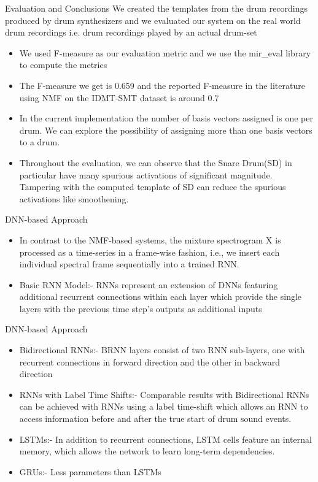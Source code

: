 \begin{frame}[t,fragile]{Evaluation and Conclusions}
We created the templates from the drum recordings produced by drum synthesizers and we evaluated our system on the real world drum recordings i.e. drum recordings played by an actual drum-set
\begin{itemize}
\item We used F-measure as our evaluation metric and we use the mir\_eval library to compute the metrics
\item The F-measure we get is 0.659 and the reported F-measure in the literature using NMF on the IDMT-SMT dataset is around $0.7$
\item In the current implementation the number of basis vectors assigned is one per drum. We can explore the possibility of assigning more than one basis vectors to a drum.
\item Throughout the evaluation, we can observe that the Snare Drum(SD) in particular have many spurious activations of significant magnitude. Tampering with the computed template of SD can reduce the spurious activations like smoothening.
\end{itemize}
\end{frame}


\begin{frame}[t,fragile]{DNN-based Approach}
\begin{itemize}

\item In contrast to the NMF-based systems, the mixture spectrogram X is processed as a time-series in a frame-wise fashion, i.e., we insert each individual spectral frame sequentially into a trained RNN.

\item Basic RNN Model:- RNNs represent an extension of DNNs featuring additional recurrent connections within each layer which provide the single layers with the previous time step’s outputs as additional inputs

\end{itemize}
\end{frame}
\begin{frame}[t,fragile]{DNN-based Approach}
\begin{itemize}
\item Bidirectional RNNs:- BRNN layers consist of two RNN sub-layers, one with recurrent connections in forward direction and the other in backward direction

\item RNNs with Label Time Shifts:- Comparable results with Bidirectional RNNs can be achieved with RNNs using a label time-shift which allows an RNN to access information before and after the true start of drum sound events.

\item LSTMs:- In addition to recurrent connections, LSTM cells feature an internal memory, which allows the network to learn long-term dependencies.

\item GRUs:- Less parameters than LSTMs
\end{itemize}
\end{frame}

